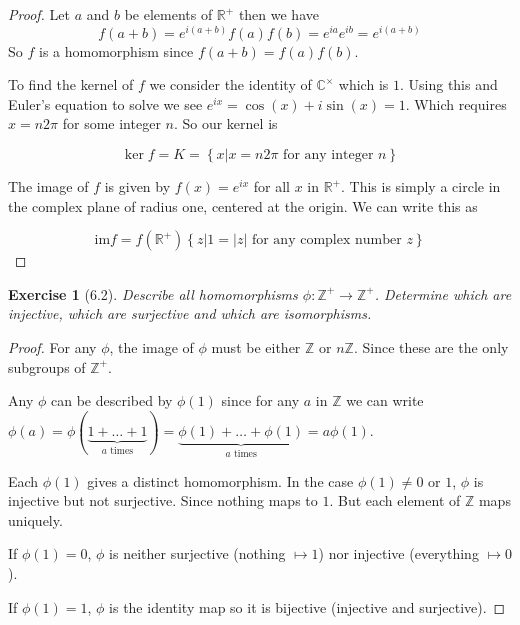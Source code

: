 \documentclass[12pt,leqno]{article}
\numberwithin{equation}{section}
\newtheorem*{exer}{Exercise}
\theoremstyle{definition}
\begin{document}
\begin{proof}[Proof]

    Let $a$ and $b$ be elements of $\mathbb R^+$ then we have
    $$
    f(a + b) = e^{i(a + b)}
    f(a)f(b) = e^{ia} e^{ib} = e^{i(a + b)}
    $$
    So $f$ is a homomorphism since $f(a + b) = f(a)f(b)$.

    To find the kernel of $f$ we consider the identity of $\mathbb C^{\times}$
    which is $1$.  Using this and Euler's equation to solve we see $e^{ix} =
    \cos(x) + i\sin(x) = 1$. Which requires $x = n 2 \pi$ for some integer $n$.
    So our kernel is

    $$
    \ker f = K = \left\{x \vert x = n 2 \pi \text{ for any integer } n \right\}
    $$

    The image of $f$ is given by $f(x) = e^{ix} $ for all $x$ in $\mathbb R^+$.
    This is simply a circle in the complex plane of radius one, centered at the
    origin. We can write this as 
    
    $$
    \text{im} f = f(\mathbb R^+) \left\{z \vert 1 = |z| \text{ for any complex number }z \right\}
    $$

\end{proof}

\begin{exer}[6.2]
Describe all homomorphisms $\phi: \mathbb Z^{+} \rightarrow \mathbb Z^+$. Determine which are injective, which are surjective and which are isomorphisms.
\end{exer}

\begin{proof}[Proof]

    For any $\phi$, the image of $\phi$ must be either $\mathbb Z$ or $n \mathbb Z$.
    Since these are the only subgroups of $\mathbb Z^+$.

    Any $\phi$ can be described by $\phi(1)$ since for any $a$ in $\mathbb Z$
    we can write $\phi(a) = \phi(\underbrace{1 + \dots + 1}_{a \text{ times}})
    = \underbrace{\phi(1) + \dots + \phi(1)}_{a \text{ times}} = a \phi(1)$.

    Each $\phi(1)$ gives a distinct homomorphism. In the case $\phi(1) \neq 0 \text{ or } 1$, $\phi$ is
    injective but not surjective. Since nothing maps to $1$. But each element of $\mathbb Z$ maps uniquely.

    If $\phi(1) = 0$, $\phi$ is neither surjective (nothing $\mapsto 1$) nor injective (everything $\mapsto 0$).

    If $\phi(1) = 1$, $\phi$ is the identity map so it is bijective (injective and surjective). 

\end{proof}
\end{document}
